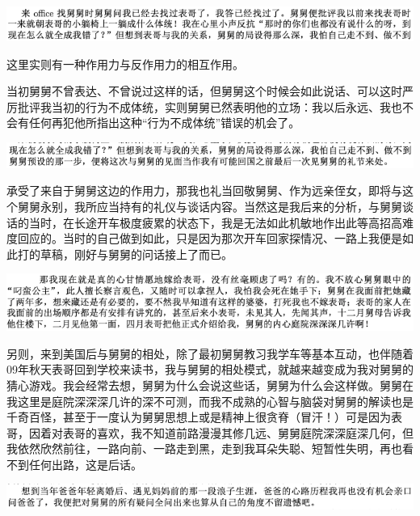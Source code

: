 \documentclass[9pt, b5paper]{article}
\begin{document}
\begin{center}
\includegraphics[width=.9\linewidth]{./pic/p1p120-2.png}
\end{center}

这里实则有一种作用力与反作用力的相互作用。

当初舅舅不曾表达、不曾说过这样的话，但舅舅这个时候会如此说话、可以这时严厉批评我当初的行为不成体统，实则舅舅已然表明他的立场：我以后永远、我也不会有任何再犯他所指出这种“行为不成体统”错误的机会了。

\begin{center}
\includegraphics[width=.9\linewidth]{./pic/p1p120-9.png}
\end{center}

承受了来自于舅舅这边的作用力，那我也礼当回敬舅舅、作为远亲侄女，即将与这个舅舅永别，我所应当持有的礼仪与谈话内容。当然这是我后来的分析，与舅舅谈话的当时，在长途开车极度疲累的状态下，我是无法如此机敏地作出此等高招高难度回应的。当时的自己做到如此，只是因为那次开车回家探情况、一路上我便是如此打的草稿，刚好与舅舅的问话接上了而已。 

\begin{center}
\includegraphics[width=.9\linewidth]{./pic/p1p63-5.png}
\end{center}

另则，来到美国后与舅舅的相处，除了最初舅舅教习我学车等基本互动，也伴随着09年秋天表哥回到学校来读书，我与舅舅的相处模式，就越来越变成为我对舅舅的猜心游戏。我会经常去想，舅舅为什么会说这些话，舅舅为什么会这样做。舅舅在我这里是庭院深深深几许的深不可测，而我不成熟的心智与脑袋对舅舅的解读也是千奇百怪，甚至于一度认为舅舅思想上或是精神上很贪脊（冒汗！）可是因为表哥，因着对表哥的喜欢，我不知道前路漫漫其修几远、舅舅庭院深深庭深几何，但我依然欣然前往，一路向前、一路走到黑，走到我耳朵失聪、短暂性失明，再也看不到任何出路，这是后话。

\begin{center}
\includegraphics[width=.9\linewidth]{./pic/p1p120-3.png}
\end{center}
\end{document}
